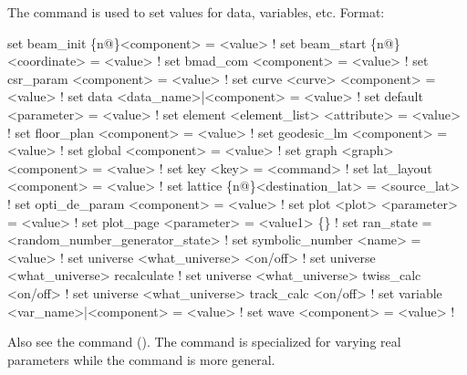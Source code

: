 {{The  command is used to set values for data,
variables, etc. Format:
\begin{example}
  set beam_init \{n@\}<component> = <value>                   ! 
  set beam_start \{n@\}<coordinate> = <value>                 ! 
  set bmad_com <component> = <value>                        ! 
  set csr_param <component> = <value>                       ! 
  set curve <curve> <component> = <value>                   ! 
  set data <data_name>|<component> = <value>                ! 
  set default <parameter> = <value>                         ! 
  set element <element_list> <attribute> = <value>          ! 
  set floor_plan <component> = <value>                      ! 
  set geodesic_lm <component> = <value>                     ! 
  set global <component> = <value>                          ! 
  set graph <graph> <component> = <value>                   ! 
  set key <key> = <command>                                 ! 
  set lat_layout <component> = <value>                      ! 
  set lattice \{n@\}<destination\_lat> = <source\_lat>          ! 
  set opti_de_param <component> = <value>                   ! 
  set plot <plot> <parameter> = <value>                     ! 
  set plot_page <parameter> = <value1> \{<value2>\}           ! 
  set ran_state = <random_number_generator_state>           ! 
  set symbolic_number <name> = <value>                      ! 
  set universe <what_universe> <on/off>                     ! 
  set universe <what_universe> recalculate                  ! 
  set universe <what_universe> twiss_calc <on/off>          ! 
  set universe <what_universe> track_calc <on/off>          ! 
  set variable <var_name>|<component> = <value>             ! 
  set wave <component> = <value>                            ! 
\end{example}

\vskip 10pt 

Also see the  command (). The  command is specialized
for varying real parameters while the  command is more general.

}}
